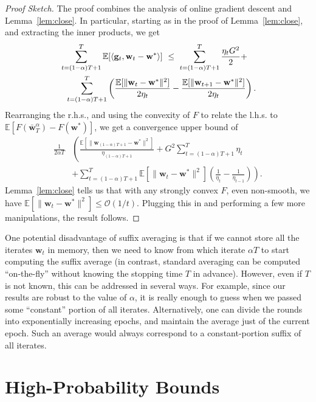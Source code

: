 \documentclass{article}
\newcommand{\E}{\mathbb{E}}
\newcommand{\bw}{\mathbf{w}}
\newcommand{\bg}{\mathbf{g}}
\newcommand{\Ocal}{\mathcal{O}}
\newcommand{\norm}[1]{\|#1\|}
\newcommand{\inner}[1]{\langle#1\rangle}
\newcommand{\lemref}[1]{Lemma~\ref{#1}}
\begin{document}
\begin{proof}[Proof Sketch]
The proof combines the analysis of online gradient descent \cite{HazAgKal07} and \lemref{lem:close}. In particular, starting as in the proof of \lemref{lem:close}, and extracting the inner products, we get
\begin{align}
&\sum_{t=(1-\alpha) T+1}^{T}\E[\inner{\bg_t,\bw_t-\bw^{*}}]
~\leq~ \sum_{t=(1-\alpha) T+1}^{T}\frac{\eta_t G^2}{2} +\notag\\
&~~
\sum_{t=(1-\alpha) T+1}^{T}\left(\frac{\E[\norm{\bw_t-\bw^{*}}^2]}{2\eta_t}-\frac{\E[\norm{\bw_{t+1}-\bw^{*}}^2]}{2\eta_t}\right).
\label{eq:half1}
\end{align}
Rearranging the r.h.s., and using the convexity of $F$ to relate the l.h.s. to $\E[F(\bar{\bw}^{\alpha}_{T})-F(\bw^{*})]$, we get a convergence upper bound of
\begin{align*}
\frac{1}{2\alpha T}&\left(\frac{\E[\norm{\bw_{(1-\alpha)T+1}
-\bw^*}^2]}{\eta_{(1-\alpha)T+1}}+G^2\sum_{t=(1-\alpha)T+1}^{T}\eta_t
\right. \\
&+
\left.
\sum_{t=(1-\alpha)T+1}^{T}\E[\norm{\bw_t-\bw^*}^2]
\left(\frac{1}{\eta_t}-\frac{1}{\eta_{t-1}}\right)\right).
\end{align*}
\lemref{lem:close} tells us that with any strongly convex $F$, even non-smooth, we have $\E[\norm{\bw_t-\bw^{*}}^2]\leq \Ocal(1/t)$. Plugging this in and performing a few more manipulations, the result follows.
\end{proof}

One potential disadvantage of suffix averaging is that if we cannot store all the iterates $\bw_t$ in memory, then we need to know from which iterate $\alpha T$ to start computing the suffix average (in contrast, standard averaging can be computed ``on-the-fly'' without knowing the stopping time $T$ in advance). However, even if $T$ is not known, this can be addressed in several ways. For example, since our results are robust to the value of $\alpha$, it is really enough to guess when we passed some ``constant'' portion of all iterates. Alternatively, one can divide the rounds into exponentially increasing epochs, and maintain the average just of the current epoch. Such an average would always correspond to a constant-portion suffix of all iterates.

\section{High-Probability Bounds}\label{sec:high_probability}
\end{document}
